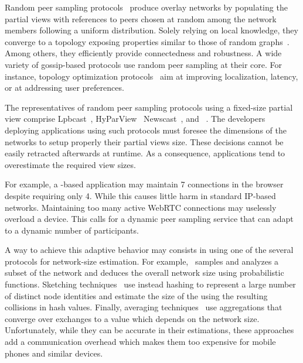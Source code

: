 Random peer sampling protocols~\cite{jelasity2004peer,
  jelasity2007gossip} produce overlay networks by populating the
partial views with references to peers chosen at random among the
network members following a uniform distribution. Solely relying on
local knowledge, they converge to a topology exposing properties
similar to those of random graphs~\cite{erdos1959random}. Among
others, they efficiently provide connectedness and robustness. A wide
variety of gossip-based protocols use random peer sampling at their
core. For instance, topology optimization
protocols~\cite{voulgaris2005epidemic, jelasity2009tman} aim at
improving localization, latency, or at addressing user preferences.

The representatives of random peer sampling protocols using a
fixed-size partial view comprise
Lpbcast~\cite{eugster2003lightweight},
HyParView~\cite{leitao2007hyparview}
Newscast~\cite{tolgyeski2009adaptive}, and
\CYCLON~\cite{voulgaris2005cyclon}. The developers deploying
applications using such protocols must foresee the dimensions of the
networks to setup properly their partial views size. These decisions
cannot be easily retracted afterwards at runtime. As a consequence,
applications tend to overestimate the required view sizes.

For example, a \CYCLON-based application may maintain 7 connections in
the browser despite requiring only 4. While this causes little harm in
standard IP-based networks. Maintaining too many active WebRTC
connections may uselessly overload a device. This calls for a dynamic
peer sampling service that can adapt to a dynamic number of
participants.

A way to achieve this adaptive behavior may consists in using one of
the several protocols for network-size estimation. For
example,~\cite{ganesh2007peer} samples and analyzes a subset of the
network and deduces the overall network size using probabilistic
functions.  Sketching techniques~\cite{baquero2012extrema} use instead
hashing to represent a large number of distinct node identities and
estimate the size of the using the resulting collisions in hash
values. Finally, averaging techniques~\cite{jelasity2004epidemic} use
aggregations that converge over exchanges to a value which depends on
the network size. Unfortunately, while they can be accurate in their
estimations, these approaches add a communication overhead which makes
them too expensive for mobile phones and similar devices.



